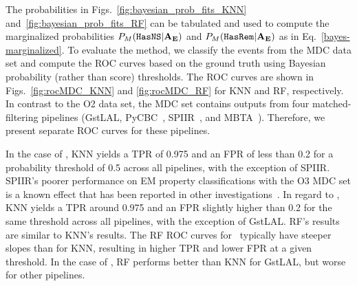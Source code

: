 

The probabilities in Figs.~\ref{fig:bayesian_prob_fits_KNN} and~\ref{fig:bayesian_prob_fits_RF} can be tabulated and used to compute the marginalized probabilities $P_M({{\tt HasNS}}|{\bf A}_{\bf E})$
and $P_M({{\tt HasRem}}|{\bf A}_{\bf E})$ as in Eq.~\eqref{bayes-marginalized}. To evaluate the method, we classify the events from the \ac{MDC} data set and compute the \ac{ROC} curves based on the
ground truth using Bayesian probability (rather than score) thresholds. The \ac{ROC} curves are shown in Figs.~\ref{fig:rocMDC_KNN} and \ref{fig:rocMDC_RF} for \ac{KNN} and \ac{RF},
respectively. In contrast to the \ac{O2} data set, the \ac{MDC} set contains outputs from four matched-filtering pipelines (GstLAL,  PyCBC~\cite{Usman:2015kfa}, SPIIR~\cite{Chu:2020pjv}, and
MBTA~\cite{Adams:2015ulm}). Therefore, we present separate \ac{ROC} curves for these pipelines. 


In the case of \hasns, \ac{KNN} yields a \ac{TPR} of 0.975 and an \ac{FPR} of less than 0.2 for a probability threshold of 0.5 across all pipelines, with the exception of SPIIR. SPIIR's poorer
performance on \ac{EM} property classifications with the \ac{O3} \ac{MDC} set is a known effect that has been reported in other investigations~\cite{Chaudhary:2023vec}. In regard to \hasrem,
\ac{KNN} yields a \ac{TPR} around 0.975 and an \ac{FPR} slightly higher than 0.2 for the same threshold across all pipelines, with the exception of GstLAL. \ac{RF}'s results are similar to
\ac{KNN}'s results. The \ac{RF} \ac{ROC} curves for \hasns\ typically have steeper slopes than for \ac{KNN}, resulting in higher \ac{TPR} and lower \ac{FPR} at a given threshold. In the case of
\hasrem, \ac{RF} performs better than \ac{KNN} for GstLAL, but worse for other pipelines.


